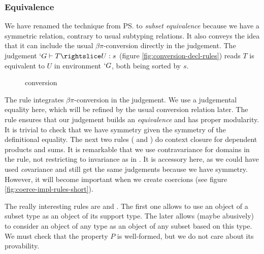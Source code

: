 \documentclass{llncs}
\begin{document}
\subsubsection{Equivalence}
We have renamed the technique from \ps{} to 
\emph{subset equivalence} because we have a symmetric relation, contrary
to usual subtyping relations. It also conveys the idea that it can
include the usual $\beta\pi$-conversion directly in the judgement.
The judgement $`G \typed T \subd{} U : s$ (figure
\vref{fig:conversion-decl-rules}) reads $T$ is equivalent to $U$ in
environment $`G$, both being sorted by $s$. 

\begin{figure}[h]
  \subtdRules
  \caption{\Russell{} conversion}
  \label{fig:conversion-decl-rules}
\end{figure}

The rule  integrates $\beta\pi$-conversion in the
judgement. We use a judgemental equality here, which will be refined by
the usual conversion relation later. The  rule ensures
that our judgement builds an \emph{equivalence} and has
proper modularity. It is trivial to check that we have symmetry given 
the symmetry of the definitional equality. The next two rules ( and
) do context closure for dependent
products and sums. It is remarkable that we use contravariance for
domains in the  rule, not restricting to invariance as in
\PVS. It is accessory here, as we could have used \emph{co}variance and
still get the same judgements because we have symmetry. However, it will
become important when we create coercions (see figure
\vref{fig:coerce-impl-rules-short}).

The really interesting rules are  and
. The first one allows to use an object of a subset type
as an object of its support type. The later allows (maybe abusively) to
consider an object of any type as an object of any subset based on
this type. We must check that the property $P$ is well-formed, but
we do not care about its provability.
\end{document}
